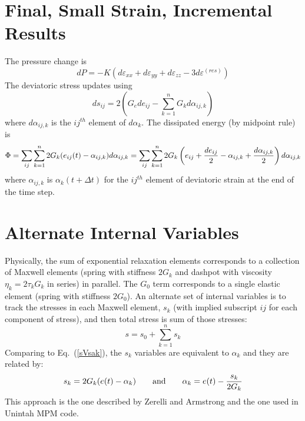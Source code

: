 \documentclass[11pt]{book}
\def\e#1{\varepsilon_{#1}}
\def\er#1{\varepsilon_{#1}^{(res)}}
\begin{document}
\section{Final, Small Strain, Incremental Results}

The pressure change is
\begin{equation}
     dP = -K(d\e{xx} + d\e{yy} + d\e{zz} - 3d\er{})
\end{equation}
The deviatoric stress updates using
\begin{equation}
     ds_{ij} = 2\left( G_e de_{ij} -   \sum_{k=1}^n G_k d\alpha_{ij,k} \right)
\end{equation}
where $d\alpha_{ij,k}$ is the $ij^{th}$ element of $d\alpha_k$.
The dissipated energy (by midpoint rule) is
\begin{equation}
     \Phi = \sum_{ij}\sum_{k=1}^n 2G_k(e_{ij}(t)-\alpha_{ij,k})d\alpha_{ij,k} = \sum_{ij} \sum_{k=1}^n 2G_k\left(e_{ij}+{de_{ij}\over 2}-\alpha_{ij,k}+{d\alpha_{ij,k}\over 2}\right) d\alpha_{ij,k}
\end{equation}
where $\alpha_{ij,k}$ is $\alpha_k(t+\Delta t)$ for the $ij^{th}$ element of deviatoric strain at the end of the time step.

\section{Alternate Internal Variables}

Physically, the sum of exponential relaxation elements corresponds to a collection of Maxwell elements (spring with stiffness $2G_k$ and dashpot with viscosity $\eta_k = 2\tau_kG_k$ in series) in parallel. The $G_0$ term corresponds to a single elastic element (spring with stiffness $2G_0$). An alternate set of internal variables is to track the stresses in each Maxwell element, $s_k$ (with implied subscript $ij$ for each component of stress), and then total stress is sum of those stresses:
\begin{equation}
       s = s_0 + \sum_{k=1}^n s_k
\end{equation}
Comparing to Eq.~(\ref{sVsak}), the $s_k$ variables are equivalent to $\alpha_k$ and they are related by:
\begin{equation}
       s_k = 2G_k(e(t)-\alpha_k)    \qquad{\rm and}\qquad \alpha_k = e(t) - {s_k\over 2G_k}
\end{equation}
This approach is the one described by Zerelli and Armstrong and the one used in Unintah MPM code.
\end{document}
